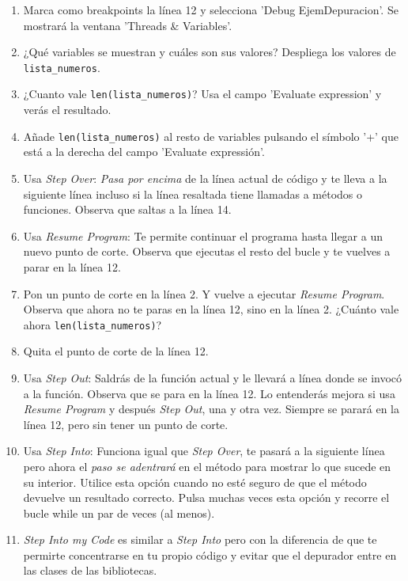 \begin{enumerate}
\begin{enumerate}[label=\arabic*)]
\item Marca como breakpoints la línea 12 y selecciona 'Debug EjemDepuracion'. Se mostrará la ventana 'Threads \& Variables'.
\item ¿Qué variables se muestran y cuáles son sus valores? Despliega los valores de {\tt lista\_numeros}.
\item ¿Cuanto vale {\tt len(lista\_numeros)}? Usa el campo 'Evaluate expression' y verás el resultado. 
\item Añade {\tt len(lista\_numeros)} al resto de variables pulsando el símbolo '+' que está a la derecha del campo 'Evaluate expressión'.
\item Usa \textit{Step Over}: \textit{Pasa por encima} de la línea actual de código y te lleva a la siguiente línea incluso si la línea resaltada tiene llamadas a métodos o funciones. Observa que saltas a la línea 14.
\item Usa \textit{Resume Program}: Te permite continuar el programa hasta llegar a un nuevo punto de corte. Observa que ejecutas el resto del bucle y te vuelves a parar en la línea 12.
\item Pon un punto de corte en la línea 2. Y vuelve a ejecutar \textit{Resume Program}. Observa que ahora no te paras en la línea 12, sino en la línea 2. ¿Cuánto vale ahora {\tt len(lista\_numeros)}?
\item Quita el punto de corte de la línea 12.
\item Usa \textit{Step Out}: Saldrás de la función actual y le llevará a línea donde se invocó a la función. Observa que se para en la línea 12. Lo entenderás mejora si usa \textit{Resume Program} y después \textit{Step Out}, una y otra vez. Siempre se parará en la línea 12, pero sin tener un punto de corte.
\item Usa \textit{Step Into}: Funciona igual que \textit{Step Over}, te pasará a la siguiente línea pero ahora el \textit{paso se adentrará} en el método para mostrar lo que sucede en su interior. Utilice esta opción cuando no esté seguro de que el método devuelve un resultado correcto. Pulsa muchas veces esta opción y recorre el bucle while un par de veces (al menos).
\item \textit{Step Into my Code} es similar a \textit{Step Into} pero con la diferencia de que te permirte concentrarse en tu propio código y evitar que el depurador entre en las clases de las bibliotecas.
\end{enumerate}




\end{enumerate}
